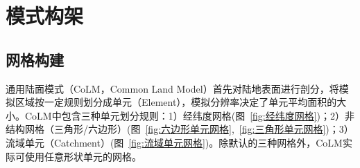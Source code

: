 \chapter{模式构架}\label{模式构架}
\section{网格构建}\label{网格构建}

通用陆面模式（CoLM，Common Land Model）首先对陆地表面进行剖分，将模拟区域按一定规则划分成单元（Element），模拟分辨率决定了单元平均面积的大小。CoLM中包含三种单元划分规则：1）经纬度网格(图~\ref{fig:经纬度网格})；2）非结构网格（三角形/六边形）(图~\ref{fig:六边形单元网格},~\ref{fig:三角形单元网格})；3）流域单元（Catchment）(图~\ref{fig:流域单元网格})。除默认的三种网格外，CoLM实际可使用任意形状单元的网格。


